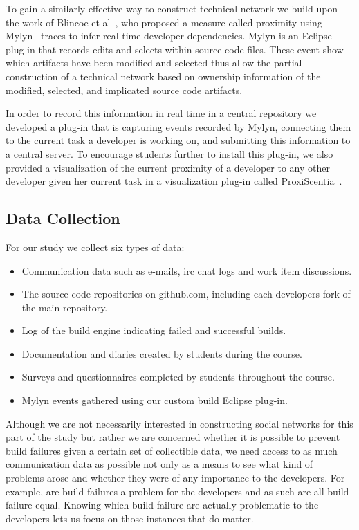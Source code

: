 To gain a similarly effective way to construct technical network we build upon the work of Blincoe et al~\cite{blincoe:cscw:2012}, who proposed a measure called proximity using Mylyn~\cite{kersten:aosd:2005} traces to infer real time developer dependencies.
Mylyn is an Eclipse plug-in that records edits and selects within source code files.
These event show which artifacts have been modified and selected thus allow the partial construction of a technical network based on ownership information of the modified, selected, and implicated source code artifacts.

In order to record this information in real time in a central repository we developed a plug-in that is capturing events recorded by Mylyn, connecting them to the current task a developer is working on, and submitting this information to a central server. 
To encourage students further to install this plug-in, we also provided a visualization of the current proximity of a developer to any other developer given her current task in a visualization plug-in called ProxiScentia~\cite{borici:chase:2012}.

\subsection{Data Collection}
For our study we collect six types of data:
\begin{itemize}
\item Communication data such as e-mails, irc chat logs and work item discussions.
\item The source code repositories on github.com, including each developers fork of the main repository.
\item Log of the build engine indicating failed and successful builds.
\item Documentation and diaries created by students during the course.
\item Surveys and questionnaires completed by students throughout the course. 
\item Mylyn events gathered using our custom build Eclipse plug-in.
\end{itemize}

Although we are not necessarily interested in constructing social networks for this part of the study but rather we are concerned whether it is possible to prevent build failures given a certain set of collectible data, we need access to as much communication data as possible not only as a means to see what kind of problems arose and whether they were of any importance to the developers.
For example, are build failures a problem for the developers and as such are all build failure equal.
Knowing which build failure are actually problematic to the developers lets us focus on those instances that do matter.

